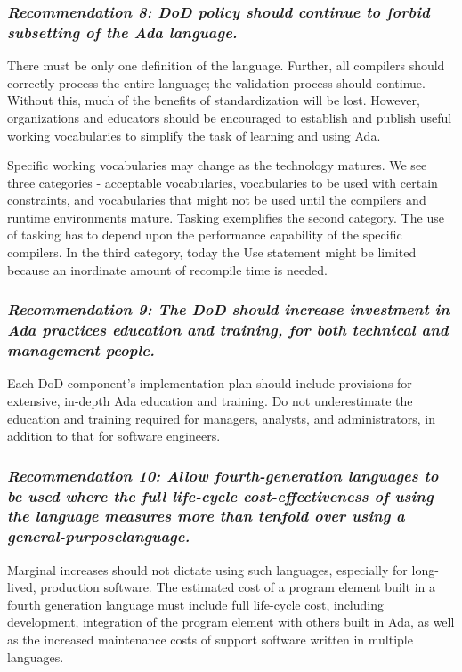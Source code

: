 \documentclass[12pt,final]{article}
\begin{document}
\subsubsection*{\textit{Recommendation 8: DoD policy should continue to forbid subsetting of the Ada
language.}}

There must be only one definition of the language. Further, all compilers
should correctly process the entire language; the validation process should
continue. Without this, much of the benefits of standardization will be lost.
However, organizations and educators should be encouraged to establish and
publish useful working vocabularies to simplify the task of learning and using
Ada.

Specific working vocabularies may change as the technology matures. We see
three categories - acceptable vocabularies, vocabularies to be used with
certain constraints, and vocabularies that might not be used until the
compilers and runtime environments mature. Tasking exemplifies the second
category. The use of tasking has to depend upon the performance capability of
the specific compilers. In the third category, today the Use statement might be
limited because an inordinate amount of recompile time is needed.

\subsubsection*{\textit{Recommendation 9: The DoD should increase investment in
Ada practices education and training, for both technical and management
people.}}

Each DoD component’s implementation plan should include provisions for
extensive, in-depth Ada education and training. Do not underestimate the
education and training required for managers, analysts, and administrators, in
addition to that for software engineers.

\subsubsection*{\textit{Recommendation 10: Allow fourth-generation languages to
be used where the full life-cycle cost-effectiveness of using the language
measures more than tenfold over using a general-purposelanguage.}}

Marginal increases should not dictate using such languages, especially for
long-lived, production software. The estimated cost of a program element built
in a fourth generation language must include full life-cycle cost, including
development, integration of the program element with others built in Ada, as
well as the increased maintenance costs of support software written in multiple
languages.
\end{document}
